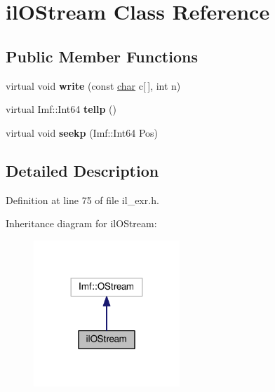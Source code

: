 \hypertarget{classilOStream}{}\section{il\+O\+Stream Class Reference}
\label{classilOStream}
\subsection*{Public Member Functions}
\begin{DoxyCompactItemize}
\item 
\mbox{\label{classilOStream_a14d3ede22942be7d4afc108021104e1a}} 
virtual void {\bfseries write} (const \hyperlink{classchar}{char} c\mbox{[}$\,$\mbox{]}, int n)
\item 
\mbox{\label{classilOStream_abbfa67f495bf1256580b70f051b3e3dd}} 
virtual Imf\+::\+Int64 {\bfseries tellp} ()
\item 
\mbox{\label{classilOStream_abb97fe777f880cf0cb7b8729c71930e3}} 
virtual void {\bfseries seekp} (Imf\+::\+Int64 Pos)
\end{DoxyCompactItemize}


\subsection{Detailed Description}


Definition at line 75 of file il\+\_\+exr.\+h.



Inheritance diagram for il\+O\+Stream\+:
\nopagebreak
\begin{figure}[H]
\begin{center}
\leavevmode
\includegraphics[width=156pt]{d3/df5/classilOStream__inherit__graph}
\end{center}
\end{figure}


